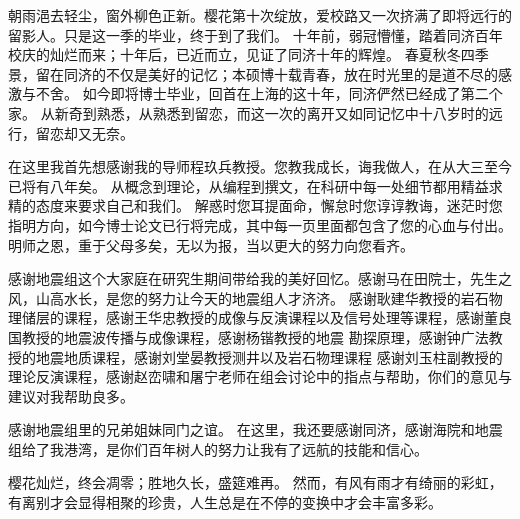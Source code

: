 

\begin{ack}
	朝雨浥去轻尘，窗外柳色正新。樱花第十次绽放，爱校路又一次挤满了即将远行的留影人。只是这一季的毕业，终于到了我们。
	十年前，弱冠懵懂，踏着同济百年校庆的灿烂而来；十年后，已近而立，见证了同济十年的辉煌。
	春夏秋冬四季景，留在同济的不仅是美好的记忆；本硕博十载青春，放在时光里的是道不尽的感激与不舍。
	如今即将博士毕业，回首在上海的这十年，同济俨然已经成了第二个家。
	从新奇到熟悉，从熟悉到留恋，而这一次的离开又如同记忆中十八岁时的远行，留恋却又无奈。

	在这里我首先想感谢我的导师程玖兵教授。您教我成长，诲我做人，在从大三至今已将有八年矣。
	从概念到理论，从编程到撰文，在科研中每一处细节都用精益求精的态度来要求自己和我们。
	解惑时您耳提面命，懈怠时您谆谆教诲，迷茫时您指明方向，如今博士论文已行将完成，其中每一页里面都包含了您的心血与付出。
	明师之恩，重于父母多矣，无以为报，当以更大的努力向您看齐。

	感谢地震组这个大家庭在研究生期间带给我的美好回忆。感谢马在田院士，先生之风，山高水长，是您的努力让今天的地震组人才济济。
	感谢耿建华教授的岩石物理储层的课程，感谢王华忠教授的成像与反演课程以及信号处理等课程，感谢董良国教授的地震波传播与成像课程，感谢杨锴教授的地震
	勘探原理，感谢钟广法教授的地震地质课程，感谢刘堂晏教授测井以及岩石物理课程
	感谢刘玉柱副教授的理论反演课程，感谢赵峦啸和屠宁老师在组会讨论中的指点与帮助，你们的意见与建议对我帮助良多。

	感谢地震组里的兄弟姐妹同门之谊。
	在这里，我还要感谢同济，感谢海院和地震组给了我港湾，是你们百年树人的努力让我有了远航的技能和信心。

	樱花灿烂，终会凋零；胜地久长，盛筵难再。
	然而，有风有雨才有绮丽的彩虹，
	有离别才会显得相聚的珍贵，人生总是在不停的变换中才会丰富多彩。


\end{ack}
